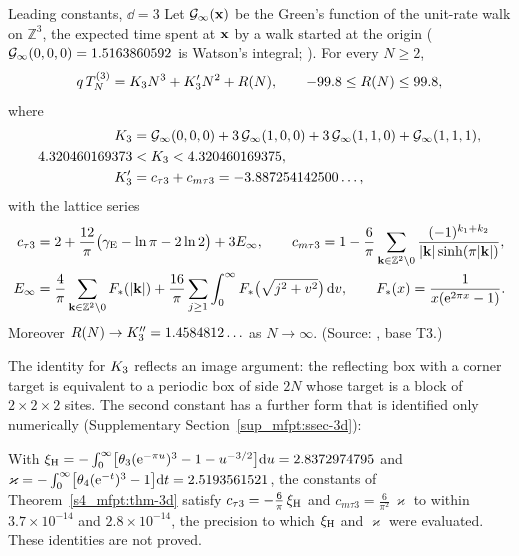 \begin{catheorem}{Leading constants, $\dd=3$}\label{s4_mfpt:thm-3d}
Let $\mathcal{G}_{\infty}(\mathbf{x})$ be the Green's function of the unit-rate walk on $\mathbb Z^{3}$, the expected time spent at $\mathbf{x}$ by a
walk started at the origin ($\mathcal{G}_{\infty}(0,0,0)=1.5163860592$ is Watson's integral; \citealp{Watson1939}). For every $N\ge2$,
\begin{equation*}
  q\,T_{N}^{(3)}=K_{3} N^{3}+K_{3}' N^{2}+R(N),\qquad -99.8\le R(N)\le99.8,
\end{equation*}
where
\begin{align*}
  K_{3}&=\mathcal{G}_{\infty}(0,0,0)+3\,\mathcal{G}_{\infty}(1,0,0)+3\,\mathcal{G}_{\infty}(1,1,0)+\mathcal{G}_{\infty}(1,1,1),\\
  4.320460169373&<K_{3}<4.320460169375,\\
  K_{3}'&=c_{\tau3}+c_{m\tau3}=-3.887254142500\ldots,
\end{align*}
with the lattice series
\begin{align*}
  c_{\tau3}&=2+\frac{12}{\pi}\bigl(\gamma_{\mathrm{E}}-\ln\pi-2\ln2\bigr)+3E_\infty,\qquad
  c_{m\tau3}=1-\frac6\pi\sum_{\mathbf{k}\in\mathbb Z^{2}\setminus0}\frac{(-1)^{k_1+k_2}}{|\mathbf{k}|\sinh(\pi|\mathbf{k}|)},\\
  E_\infty&=\frac4\pi\sum_{\mathbf{k}\in\mathbb Z^{2}\setminus0}F_*(|\mathbf{k}|)+\frac{16}\pi\sum_{j\ge1}\int_0^\infty
  F_*\bigl(\sqrt{j^{2}+v^{2}}\bigr)\,\mathrm{d} v,\qquad F_*(x)=\frac{1}{x(\mathrm{e}^{2\pi x}-1)} .
\end{align*}
Moreover $R(N)\to K_{3}''=1.4584812\ldots$ as $N\to\infty$.
\textup{(Source: , base T3.)}
\end{catheorem}

The identity for $K_{3}$ reflects an image argument: the reflecting box with a corner target is equivalent to a
periodic box of side $2N$ whose target is a block of $2\times2\times2$ sites. The second constant has a further form that
is identified only numerically (Supplementary Section~\ref{sup_mfpt:ssec-3d}):

\begin{observation}\label{s4_mfpt:obs-3d}
With $\xi_{\mathrm{H}}=-\int_{0}^{\infty}\bigl[\theta_{3}(\mathrm{e}^{-\pi u})^{3}-1-u^{-3/2}\bigr]\mathrm{d} u=2.8372974795$ and
$\varkappa=-\int_{0}^{\infty}\bigl[\theta_{4}(\mathrm{e}^{-t})^{3}-1\bigr]\mathrm{d} t=2.5193561521$, the constants of
Theorem~\ref{s4_mfpt:thm-3d} satisfy $c_{\tau3}=-\frac6\pi\,\xi_{\mathrm{H}}$ and $c_{m\tau3}=\frac6{\pi^{2}}\,\varkappa$ to within
$3.7\times10^{-14}$ and $2.8\times10^{-14}$, the precision to which $\xi_{\mathrm{H}}$ and $\varkappa$ were evaluated. These
identities are not proved.
\end{observation}

